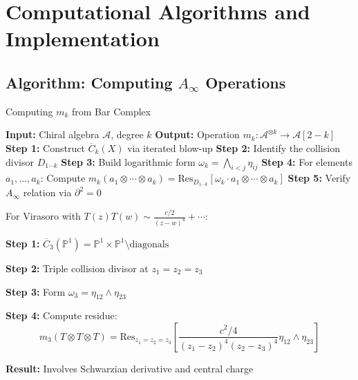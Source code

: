 
\section{Computational Algorithms and Implementation}

\subsection{Algorithm: Computing $A_\infty$ Operations}


\begin{algorithm}[htbp]
\caption{Computing $m_k$ from Bar Complex}
\begin{algorithmic}[1]
\State \textbf{Input:} Chiral algebra $\mathcal{A}$, degree $k$
\State \textbf{Output:} Operation $m_k: \mathcal{A}^{\otimes k} \to \mathcal{A}[2-k]$
\State
\State \textbf{Step 1:} Construct $\overline{C}_k(X)$ via iterated blow-up
\State \textbf{Step 2:} Identify the collision divisor $D_{1\cdots k}$
\State \textbf{Step 3:} Build logarithmic form $\omega_k = \bigwedge_{i<j} \eta_{ij}$
\State \textbf{Step 4:} For elements $a_1, \ldots, a_k$:
\State \quad Compute $m_k(a_1 \otimes \cdots \otimes a_k) = \text{Res}_{D_{1\cdots k}}[\omega_k \cdot a_1 \otimes \cdots \otimes a_k]$
\State \textbf{Step 5:} Verify $A_\infty$ relation via $\partial^2 = 0$
\end{algorithmic}
\end{algorithm}

\begin{example}
For Virasoro with $T(z)T(w) \sim \frac{c/2}{(z-w)^4} + \cdots$:

\textbf{Step 1:} $\overline{C}_3(\mathbb{P}^1) = \mathbb{P}^1 \times \mathbb{P}^1 \setminus \text{diagonals}$

\textbf{Step 2:} Triple collision divisor at $z_1 = z_2 = z_3$

\textbf{Step 3:} Form $\omega_3 = \eta_{12} \wedge \eta_{23}$

\textbf{Step 4:} Compute residue:
$$m_3(T \otimes T \otimes T) = \text{Res}_{z_1=z_2=z_3}\left[\frac{c^2/4}{(z_1-z_2)^4(z_2-z_3)^4}\eta_{12} \wedge \eta_{23}\right]$$

\textbf{Result:} Involves Schwarzian derivative and central charge
\end{example}

